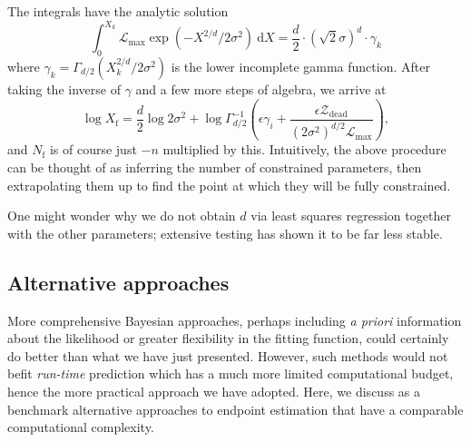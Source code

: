\documentclass[usenatbib]{mnras}
\newcommand{\Like}{\mathcal{L}}
\begin{document}
The integrals have the analytic solution
\begin{equation}
	\int_0^{X_k} \Like_\mathrm{max} \exp\left(-X^{2/d}/2\sigma^2\right)\ \mathrm{d}X = \frac{d}{2} \cdot \left(\sqrt{2}\sigma\right)^d \cdot \gamma_k
\end{equation}
where $\gamma_k = \Gamma_{d/2}\left(X_k^{2/d}/2\sigma^2\right)$ is the lower incomplete gamma function. After taking the inverse of  $\gamma$ and a few more steps of algebra, we arrive at
\begin{equation}
    \log X_\mathrm{f} = \frac{d}{2}\log 2\sigma^2	+ \log \Gamma^{-1}_{d/2} \left(\epsilon \gamma_i+ \frac{\epsilon\mathcal{Z}_\mathrm{dead}}{ \left( 2\sigma^2 \right)^{d/2}\Like_\mathrm{max}}\right),\label{eq:xf}
\end{equation}
and $N_\mathrm{f}$ is of course just $-n$ multiplied by this. Intuitively, the above procedure can be thought of as inferring the number of constrained parameters, then extrapolating them up to find the point at which they will be fully constrained. 
\par
One might wonder why we do not obtain $d$ via least squares regression together with the other parameters; extensive testing has shown it to be far less stable. 

\subsection{Alternative approaches}
More comprehensive Bayesian approaches, perhaps including \textit{a priori} information about the likelihood or greater flexibility in the fitting function, could certainly do better than what we have just presented. However, such methods would not befit \textit{run-time} prediction which has a much more limited computational budget, hence the more practical approach we have adopted. Here, we discuss as a benchmark alternative approaches to endpoint estimation that have a comparable computational complexity. 
\end{document}
